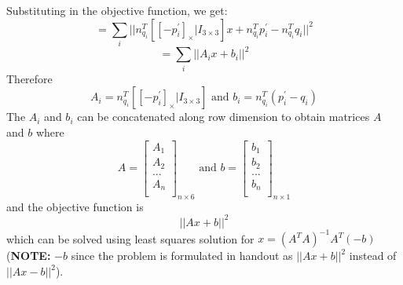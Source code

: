 \documentclass[12pt, a4paper]{article}
\begin{document}
Substituting in the objective function, we get:
\[= \sum_{i}||n_{q_i}^T\left[[-p_{i}^{'}]_\times | I_{3\times 3}\right]x + n_{q_i}^Tp_{i}^{'} - n_{q_i}^Tq_i||^2\]
\[=\sum_{i}||A_ix + b_i||^2\]
Therefore
\[A_i = n_{q_i}^T\left[[-p_{i}^{'}]_\times | I_{3\times 3}\right] \text{ and } b_i = n_{q_i}^T(p_{i}^{'} - q_i)\]
The $A_i$ and $b_i$ can be concatenated along row dimension to obtain matrices $A$ and $b$ where
\[A = \begin{bmatrix}
  A_1 \\
  A_2 \\
  ... \\
  A_n \\
\end{bmatrix}_{n\times 6} \text{ and } b = \begin{bmatrix}
  b_1 \\
  b_2 \\
  ... \\
  b_n \\
\end{bmatrix}_{n\times 1}\]
and the objective function is
\[||Ax + b||^2\]
which can be solved using least squares solution for $x = (A^TA)^{-1}A^T(-b)$ (\textbf{NOTE:} $-b$ since the problem is formulated in handout as $||Ax+b||^2$ instead of $||Ax-b||^2$).
\end{document}
